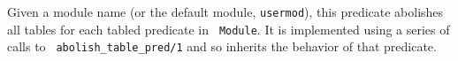 \begin{description}
\begin{description}
\comment{








}
%
Given a module name (or the default module, {\tt usermod}), this
predicate abolishes all tables for each tabled predicate in {\tt
  Module}.  It is implemented using a series of calls to {\tt
  abolish\_table\_pred/1} and so inherits the behavior of that
predicate.


\end{description}
\end{description}
